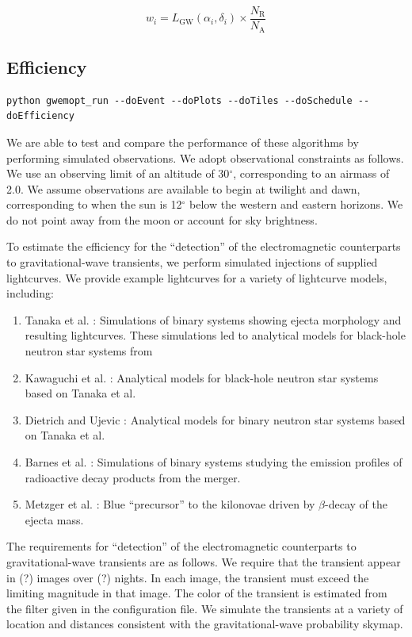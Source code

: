 \documentclass[twocolumn]{aastex61}
\newcommand{\rednote}[1]{{\color{red} (#1)}}
\begin{document}
\begin{equation}
w_i = L_\textrm{GW}(\alpha_i,\delta_i) \times \frac{N_\textrm{R}}{N_\textrm{A}} 
\end{equation}

\subsection{Efficiency}
\begin{lstlisting}
python gwemopt_run --doEvent --doPlots --doTiles --doSchedule --doEfficiency
\end{lstlisting}
We are able to test and compare the performance of these algorithms by performing simulated observations. 
We adopt observational constraints as follows. 
We use an observing limit of an altitude of 30$^\circ$, corresponding to an airmass of 2.0. 
We assume observations are available to begin at twilight and dawn, corresponding to when the sun is 12$^\circ$ below the western and eastern horizons.
We do not point away from the moon or account for sky brightness.

To estimate the efficiency for the ``detection'' of the electromagnetic counterparts to gravitational-wave transients, we perform simulated injections of supplied lightcurves. We provide example lightcurves for a variety of lightcurve models, including:

\begin{enumerate}
\item Tanaka et al. \cite{TaHo2014}: Simulations of binary systems showing ejecta morphology and resulting lightcurves.
These simulations led to analytical models for black-hole neutron star systems from \item Kawaguchi et al. \cite{KaKy2016}: Analytical models for black-hole neutron star systems based on Tanaka et al. \cite{TaHo2014}
\item Dietrich and Ujevic \cite{DiUj2017}: Analytical models for binary neutron star systems based on Tanaka et al. \cite{TaHo2014}
\item Barnes et al. \cite{BaKa2016}: Simulations of binary systems studying the emission profiles of radioactive decay products from the merger.
\item Metzger et al. \cite{MeBa2015}: Blue ``precursor'' to the kilonovae driven by $\beta$-decay of the ejecta mass.
\end{enumerate}

The requirements for ``detection'' of the electromagnetic counterparts to gravitational-wave transients are as follows.
We require that the transient appear in \rednote{?} images over \rednote{?} nights.
In each image, the transient must exceed the limiting magnitude in that image.
The color of the transient is estimated from the filter given in the configuration file.
We simulate the transients at a variety of location and distances consistent with the gravitational-wave probability skymap.
\end{document}
